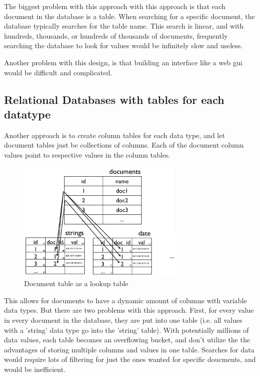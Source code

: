 The biggest problem with this approach with this approach is that each document
in the database is a table. When searching for a specific document, the database 
typically searches for the table name. This search is linear, and with hundreds,
thousands, or hundreds of thousands of documents, frequently searching the database
to look for values would be infinitely slow and useless.

Another problem with this design, is that building an interface like a web gui would
be difficult and complicated. 


\subsection{Relational Databases with tables for each datatype}
Another approach is to create column tables for each data type, and let document 
tables just be collections of columns. Each of the document column values point to 
respective values in the column tables.

\begin{figure}[h]
	\begin{center}
	\includegraphics[width=80mm]{images/rel_db_lookup}
	\caption{Document table as a lookup table} 
	\label{rel_db_lookup}
	\end{center}
\end{figure}

This allows for documents to have a dynamic amount of columns with variable data types.
But there are two problems with this approach. First, for every value in every document
in the database, they are put into one table (i.e. all values with a 'string' data type
go into the 'string' table). With potentially millions of data values, each table
becomes an overflowing bucket, and don't utilize the the advantages of storing multiple
columns and values in one table. Searches for data would require lots of filtering 
for just the ones wanted for specific doucments, and would be inefficient.


